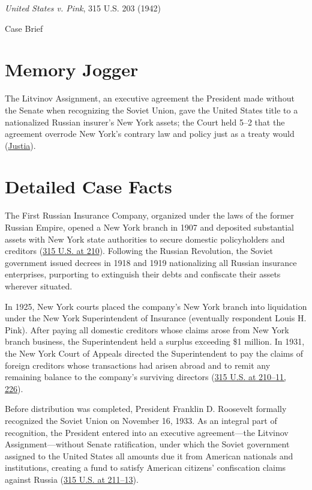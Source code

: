 \documentclass[12pt]{article}
\begin{document}
\begin{center}
{\LARGE \textit{United States v. Pink}, 315 U.S. 203 (1942)\par}
\vspace{0.8em}
{\large Case Brief\par}
\end{center}
\vspace{1em}

\section{Memory Jogger}
The Litvinov Assignment, an executive agreement the President made without the Senate when recognizing the Soviet Union, gave the United States title to a nationalized Russian insurer's New York assets; the Court held 5--2 that the agreement overrode New York's contrary law and policy just as a treaty would (\href{https://supreme.justia.com/cases/federal/us/315/203/}{Justia}).

\section{Detailed Case Facts}
The First Russian Insurance Company, organized under the laws of the former Russian Empire, opened a New York branch in 1907 and deposited substantial assets with New York state authorities to secure domestic policyholders and creditors (\href{https://www.law.cornell.edu/supremecourt/text/315/203}{315 U.S. at 210}). Following the Russian Revolution, the Soviet government issued decrees in 1918 and 1919 nationalizing all Russian insurance enterprises, purporting to extinguish their debts and confiscate their assets wherever situated.

In 1925, New York courts placed the company's New York branch into liquidation under the New York Superintendent of Insurance (eventually respondent Louis H. Pink). After paying all domestic creditors whose claims arose from New York branch business, the Superintendent held a surplus exceeding \$1 million. In 1931, the New York Court of Appeals directed the Superintendent to pay the claims of foreign creditors whose transactions had arisen abroad and to remit any remaining balance to the company's surviving directors (\href{https://supreme.justia.com/cases/federal/us/315/203/}{315 U.S. at 210--11, 226}).

Before distribution was completed, President Franklin D. Roosevelt formally recognized the Soviet Union on November 16, 1933. As an integral part of recognition, the President entered into an executive agreement---the Litvinov Assignment---without Senate ratification, under which the Soviet government assigned to the United States all amounts due it from American nationals and institutions, creating a fund to satisfy American citizens' confiscation claims against Russia (\href{https://www.law.cornell.edu/supremecourt/text/315/203}{315 U.S. at 211--13}).
\end{document}
